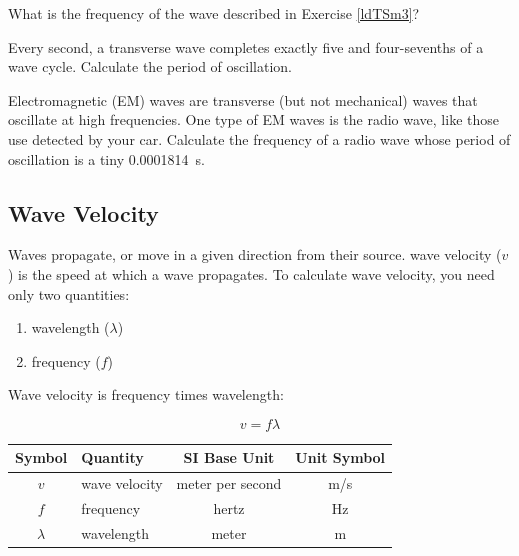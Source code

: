 \documentclass{article}
\numberwithin{equation}{section}
\numberwithin{figure}{section}
\begin{document}
\begin{exercise} \label{3rLSIq}
    What is the frequency of the wave described in Exercise \ref{ldTSm3}?
\end{exercise}

\begin{exercise} \label{gz0LQL} 
    Every second, a transverse wave completes exactly five and four-sevenths of a wave cycle. Calculate the period of oscillation.
\end{exercise}

\begin{exercise} \label{MITNpN} 
    Electromagnetic (EM) waves are transverse (but not mechanical) waves that oscillate at high frequencies. One type of EM waves is the radio wave, like those use detected by your car. Calculate the frequency of a radio wave whose period of oscillation is a tiny \SI[group-separator={\,}]{0.0001814}{s}.
\end{exercise}

\cyanhrule

\subsection{Wave Velocity} \label{nkz8rf}
Waves \gls{propagate}, or move in a given direction from their source. \Gls{wave velocity} ($v$) is the speed at which a wave propagates. To calculate wave velocity, you need only two quantities:

\begin{enumerate}
\setlength\itemsep{0.1ex}
    \item wavelength ($\lambda$)
    \item frequency ($f$)
\end{enumerate}

Wave velocity is frequency times wavelength:

\begin{equation} \label{UeynWL}
    v = f \lambda
\end{equation}


\begin{center}
    \begin{tabular}{cl|cc}
    \hline
    \textbf{Symbol} & \textbf{Quantity} & \textbf{SI Base Unit} & \textbf{Unit Symbol}  \\
    \hline\hline
        $v$ & wave velocity & meter per second & \si{\meter/\second}\\
        $f$ & frequency & hertz & \si{\Hz}\\
        $\lambda$ & wavelength & meter & m\\
    \hline
    \end{tabular}
    \label{fig:Unit10_Table}
\end{center}
\end{document}
